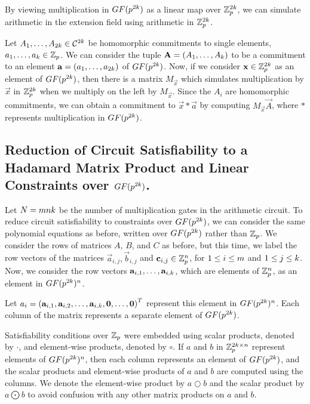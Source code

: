 {By viewing multiplication in $GF(p^{2k})$ as a linear map over $\mathbb{Z}_p^{2k}$, we can simulate arithmetic in the extension field using arithmetic in $\mathbb{Z}_p^{2k}$.

Let $A_1,\ldots,A_{2k} \in \mathcal{C}^{2k}$ be homomorphic commitments to single elements, $a_1,\ldots,a_k \in \mathbb{Z}_p$. We can consider the tuple $\mathbf{A} = (A_1,\ldots,A_k)$ to be a commitment to an element $\mathbf{a} = (a_1,\ldots,a_{2k})$ of $GF(p^{2k})$. Now, if we consider $\mathbf{x} \in \mathbb{Z}_p^{2k}$ as an element of $GF(p^{2k})$, then there is a matrix $M_{\vec{x}}$ which simulates multiplication by $\vec{x}$ in $\mathbb{Z}_p^{2k}$ when we multiply on the left by $M_{\vec{x}}$. Since the $A_i$ are homomorphic commitments, we can obtain a commitment to $\vec{x} * \vec{a}$ by computing $M_{\vec{x}} \vec{A}$, where $*$ represents multiplication in $GF(p^{2k})$.

\subsection{Reduction of Circuit Satisfiability to a Hadamard Matrix Product and Linear Constraints over $GF(p^{2k})$.}
Let $N=m n k$ be the number of multiplication gates in the arithmetic circuit. 
To reduce circuit satisfiability to constraints over $GF(p^{2k})$, we can consider the same polynomial equations as before, written over $GF(p^{2k})$ rather than $\mathbb{Z}_p$. We consider the rows of matrices $A$, $B$, and $C$ as before, but this time, we label the row vectors of the matrices $\vec{a}_{i,j},\vec{b}_{i,j}$ and $\mathbf{c}_{i,j} \in \mathbb{Z}_p^n$, for $1 \leq i \leq m$ and $1 \leq j \leq k$. Now, we consider the row vectors $\mathbf{a}_{i,1},\ldots,\mathbf{a}_{i,k}$, which are elements of $\mathbb{Z}_p^n$, as an element in $GF(p^{2k})^n$.

Let $a_i = \left( \mathbf{a}_{i,1} , \mathbf{a}_{i,2} , \dots , \mathbf{a}_{i,k} , \mathbf{0} , \dots , \mathbf{0}\right)^T$ represent this element in $GF(p^{2k})^n$. Each column of the matrix represents a separate element of $GF(p^{2k})$.

Satisfiability conditions over $\mathbb{Z}_p$ were embedded using scalar products, denoted by $\cdot$, and element-wise products, denoted by $\circ$. If $a$ and $b$ in $\mathbb{Z}_p^{2k \times n}$ represent elements of $GF(p^{2k})^n$, then each column represents an element of $GF(p^{2k})$, and the scalar products and element-wise products of $a$ and $b$ are computed using the columns. We denote the element-wise product by $a \bigcirc b$ and the scalar product by $a \bigodot b$ to avoid confusion with any other matrix products on $a$ and $b$.

}

